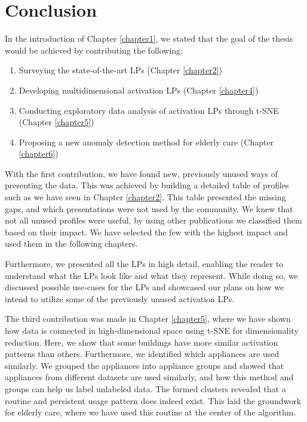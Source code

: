 \chapter{Conclusion}
\label{chapter7}

In the introduction of Chapter \ref{chapter1}, we stated that the goal of the thesis would be achieved by contributing the following:

\begin{enumerate}
\item Surveying the state-of-the-art LPs (Chapter \ref{chapter2})
\item Developing multidimensional activation LPs (Chapter \ref{chapter4})
\item Conducting exploratory data analysis of activation LPs through t-SNE (Chapter \ref{chapter5})
\item Proposing a new anomaly detection method for elderly care (Chapter \ref{chapter6})
\end{enumerate}

With the first contribution, we have found new, previously unused ways of presenting the data.
This was achieved by building a detailed table of profiles such as we have seen in Chapter \ref{chapter2}.
This table presented the missing gaps, and which presentations were not used by the community.
We knew that not all unused profiles were useful, by using other publications we classified them based on their impact. 
We have selected the few with the highest impact and used them in the following chapters.

Furthermore, we presented all the LPs in high detail, enabling the reader to understand what the LPs look like and what they represent. 
While doing so, we discussed possible use-cases for the LPs and showcased our plans on how we intend to utilize some of the previously unused activation LPs.

The third contribution was made in Chapter \ref{chapter5}, where we have shown how data is connected in high-dimensional space
using t-SNE for dimensionality reduction. Here, we show that some buildings have more similar activation patterns than others.
Furthermore, we identified which appliances are used similarly.
We grouped the appliances into appliance groups and showed that appliances from different datasets are used similarly, and how this method and groups can help us label unlabeled data.
The formed clusters revealed that a routine and persistent usage pattern does indeed exist. This laid the groundwork for elderly care, where we have used this routine at the center of the algorithm.

